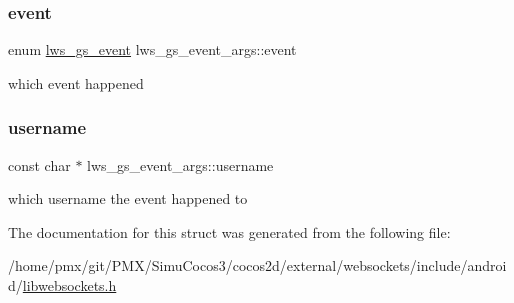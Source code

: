 \subsubsection{\texorpdfstring{event}{event}}
{\footnotesize\ttfamily enum \hyperlink{group__generic-sessions_gaa93946b3d921072209d5cd8cdfa5332e}{lws\+\_\+gs\+\_\+event} lws\+\_\+gs\+\_\+event\+\_\+args\+::event}

which event happened \mbox{\label{structlws__gs__event__args_ad6fa6018d274f0da0f0857b64662fc61}} 
\subsubsection{\texorpdfstring{username}{username}}
{\footnotesize\ttfamily const char $\ast$ lws\+\_\+gs\+\_\+event\+\_\+args\+::username}

which username the event happened to 

The documentation for this struct was generated from the following file\+:\begin{DoxyCompactItemize}
\item 
/home/pmx/git/\+P\+M\+X/\+Simu\+Cocos3/cocos2d/external/websockets/include/android/\hyperlink{_2cocos2d_2external_2websockets_2include_2android_2libwebsockets_8h}{libwebsockets.\+h}\end{DoxyCompactItemize}
